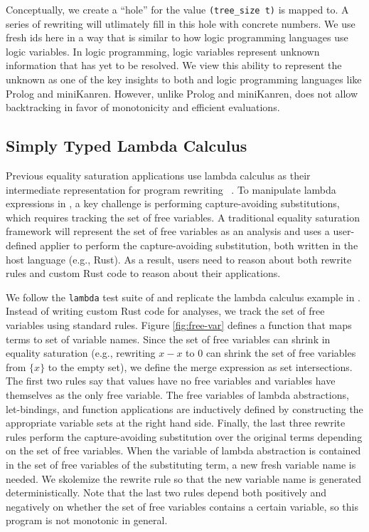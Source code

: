  Conceptually, we create a ``hole'' for the value
  \verb|(tree_size t)| is mapped to.
 A series of rewriting will utlimately fill in this hole
  with concrete numbers.
 We use fresh ids here in a way that is similar to
  how logic programming languages use logic variables.
 In logic programming,
  logic variables represent unknown information
  that has yet to be resolved.
 We view this ability to represent the unknown
  as one of the key insights
  to both \egglog and logic programming languages
  like Prolog and miniKanren.
 However, unlike Prolog and miniKanren,
  \egglog does not allow backtracking
  in favor of monotonicity and efficient evaluations.


\subsection{Simply Typed Lambda Calculus}\label{sec:stlc}


Previous equality saturation applications use lambda calculus
 as their intermediate representation for program rewriting
~\citep{koehler2021sketch,egg,storel}.
To manipulate lambda expressions in \egraphs, a key challenge is
 performing capture-avoiding substitutions,
 which requires tracking the set of free variables.
A traditional equality saturation framework will represent
 the set of free variables
 as an \eclass analysis
 and uses a user-defined applier to perform the capture-avoiding substitution,
 both written in the host language (e.g., Rust).
As a result,
 users need to reason about both rewrite rules and custom Rust code
 to reason about their applications.

We follow the \texttt{lambda} test suite of \egg \citep{egg}
 and replicate the lambda calculus example in \egglog.
Instead of writing custom Rust code for analyses,
 we track the set of free variables using standard \egglog rules.
Figure \ref{fig:free-var} defines a function that maps terms to set of variable names.
Since the set of free variables can shrink in equality saturation
 (e.g., rewriting $x-x$ to $0$ can shrink the set of free variables from $\{x\}$ to the empty set),
 we define the merge expression as set intersections.
The first two rules say that values have no free variables and variables have themselves
 as the only free variable.
The free variables of lambda abstractions, let-bindings, and function applications are
 inductively defined by constructing the appropriate variable sets at the right hand side.
Finally,
 the last three rewrite rules perform the capture-avoiding substitution
 over the original terms depending on the set of free variables.
When the variable of lambda abstraction is contained in the set of free variables
 of the substituting term,
 a new fresh variable name is needed.
We skolemize the rewrite rule
 so that the new variable name is generated deterministically.
Note that the last two rules depend both positively and negatively
 on whether the set of free variables contains a certain variable,
 so this program is not monotonic in general.

